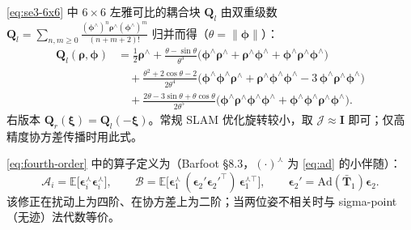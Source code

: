 \begin{derivation}
\cref{eq:se3-6x6} 中 $6\times6$ 左雅可比的耦合块 $\mathbf{Q}_l$ 由双重级数 $\mathbf{Q}_l=\sum_{n,m\ge0}\frac{(\boldsymbol{\phi}^\wedge)^n\boldsymbol{\rho}^\wedge(\boldsymbol{\phi}^\wedge)^m}{(n+m+2)!}$ 归并而得（$\theta=\|\boldsymbol{\phi}\|$）：
\begin{align*}
  \mathbf{Q}_l(\boldsymbol{\rho},\boldsymbol{\phi})
  &=\tfrac12\boldsymbol{\rho}^\wedge
   +\frac{\theta-\sin\theta}{\theta^3}\big(\boldsymbol{\phi}^\wedge\boldsymbol{\rho}^\wedge+\boldsymbol{\rho}^\wedge\boldsymbol{\phi}^\wedge+\boldsymbol{\phi}^\wedge\boldsymbol{\rho}^\wedge\boldsymbol{\phi}^\wedge\big)\\
  &\quad+\frac{\theta^2+2\cos\theta-2}{2\theta^4}\big(\boldsymbol{\phi}^\wedge\boldsymbol{\phi}^\wedge\boldsymbol{\rho}^\wedge+\boldsymbol{\rho}^\wedge\boldsymbol{\phi}^\wedge\boldsymbol{\phi}^\wedge-3\,\boldsymbol{\phi}^\wedge\boldsymbol{\rho}^\wedge\boldsymbol{\phi}^\wedge\big)\\
  &\quad+\frac{2\theta-3\sin\theta+\theta\cos\theta}{2\theta^5}\big(\boldsymbol{\phi}^\wedge\boldsymbol{\rho}^\wedge\boldsymbol{\phi}^\wedge\boldsymbol{\phi}^\wedge+\boldsymbol{\phi}^\wedge\boldsymbol{\phi}^\wedge\boldsymbol{\rho}^\wedge\boldsymbol{\phi}^\wedge\big).
\end{align*}
右版本 $\mathbf{Q}_r(\boldsymbol{\xi})=\mathbf{Q}_l(-\boldsymbol{\xi})$。常规 SLAM 优化旋转较小，取 $\boldsymbol{\mathcal{J}}\approx\mathbf{I}$ 即可；仅高精度协方差传播时用此式。
\end{derivation}

\begin{derivation}
\cref{eq:fourth-order} 中的算子定义为（Barfoot\cite{barfoot2024state} §8.3，$(\cdot)^\curlywedge$ 为 \cref{eq:ad} 的小伴随）：
\[
  \boldsymbol{\mathcal{A}}_i=\mathbb{E}\!\big[\boldsymbol{\epsilon}_i^\curlywedge\boldsymbol{\epsilon}_i^\curlywedge\big],\qquad
  \boldsymbol{\mathcal{B}}=\mathbb{E}\!\big[\boldsymbol{\epsilon}_1^\curlywedge\,(\boldsymbol{\epsilon}_2'\boldsymbol{\epsilon}_2'^\top)\,\boldsymbol{\epsilon}_1^{\curlywedge\top}\big],\qquad
  \boldsymbol{\epsilon}_2'=\mathrm{Ad}(\bar{\mathbf{T}}_1)\boldsymbol{\epsilon}_2.
\]
该修正在扰动上为四阶、在协方差上为二阶；当两位姿不相关时与 sigma-point（无迹）法代数等价。
\end{derivation}

